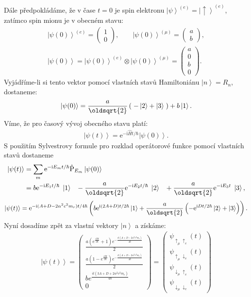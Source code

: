\documentclass[10pt,a4paper]{article}
\newcommand{\const}[1]{\text{#1}}
\newcommand{\mat}[1]{
    \begin{pmatrix}
        #1
    \end{pmatrix}
}
\newcommand{\ket}[1]{\left| #1 \right>}
\newcommand{\e}[1]{\const{e}^{#1}}
\renewcommand{\i}{\const{i}}
\begin{document}
Dále předpokládáme, že v čase $t=0$ je spin elektronu $\ket{\psi}^{(e)} = \ket{\uparrow}^{(e)}$, zatímco spin mionu je v obecném stavu:
\begin{gather*}
    \ket{\psi(0)}^{(e)} = \mat{1 \\ 0},
    \hspace{2em}
    \ket{\psi(0)}^{(\mu)} = \mat{a \\ b},
    \\[10pt]
    \ket{\psi(0)} = \ket{\psi(0)}^{(e)} \otimes \ket{\psi(0)}^{(\mu)}
    = \mat{a \\ 0 \\ b \\ 0}.
\end{gather*}
Vyjádříme-li si tento vektor pomocí vlastních stavů Hamiltoniánu $\ket{n} = R_n$, dostaneme:
\begin{align*}
    \ket{\psi(0)} = \frac{a}{\oldsqrt{2}} \left( \; -\ket{2} + \ket{3} \; \right) + b \ket{1}.
\end{align*}
Víme, že pro časový vývoj obecného stavu platí:
\begin{align*}
    \ket{\psi(t)} = \e{-\i \hat{H} t/\hbar} \ket{\psi(0)}.
\end{align*}
S použitím Sylvestrovy formule pro rozklad operátorové funkce pomocí vlastních stavů dostaneme
\begin{align*}
    \ket{\psi(t)} &= \sum_m \e{-\i E_m t/\hbar} \hat{\const{P}}_{E_m} \ket{\psi(0)}
    \\
    &= b \e{-\i E_1 t/\hbar} \; \ket{1} \;\;\; - \frac{a}{\oldsqrt{2}} \e{-\i E_2 t/\hbar} \; \ket{2} \;\;\; + \frac{a}{\oldsqrt{2}} \e{-\i E_3 t} \; \ket{3},
\end{align*}
\begin{gather*}
    \ket{\psi(t)} =
    \e{-\i (A + D - 2  \alpha^2 c^2  m_r) t / 4\hbar}
    \left(
        b \e{ \i (2A + D) t / 2\hbar} \ket{1} +
        \frac{a}{\oldsqrt{2}}
        \left( -\e{\i D t / 2\hbar} \ket{2} + \ket{3} \right)
    \right).
\end{gather*}
Nyní dosadíme zpět za vlastní vektory $\ket{n}$ a získáme:
\begin{gather*}
    \ket{\psi(t)}
    =
    \mat{\frac{a \left(e^{\frac{i D t}{2 \hbar}} + 1\right) e^{- \frac{i t \left(A + D - 2 \alpha^{2} c^{2} m_{r}\right)}{4 \hbar}}}{2}\\\frac{a \left(1 - e^{\frac{i D t}{2 \hbar}}\right) e^{- \frac{i t \left(A + D - 2 \alpha^{2} c^{2} m_{r}\right)}{4 \hbar}}}{2}\\b e^{\frac{i t \left(3 A + D + 2 \alpha^{2} c^{2} m_{r}\right)}{4 \hbar}}\\0}
    =
    \mat{
        \psi_{\uparrow_\mu\uparrow_e}(t) \\[5pt]
        \psi_{\uparrow_\mu\downarrow_e}(t) \\[5pt]
        \psi_{\downarrow_\mu\uparrow_e}(t) \\[5pt]
        \psi_{\downarrow_\mu\downarrow_e}(t)
    }
\end{gather*}
\end{document}
